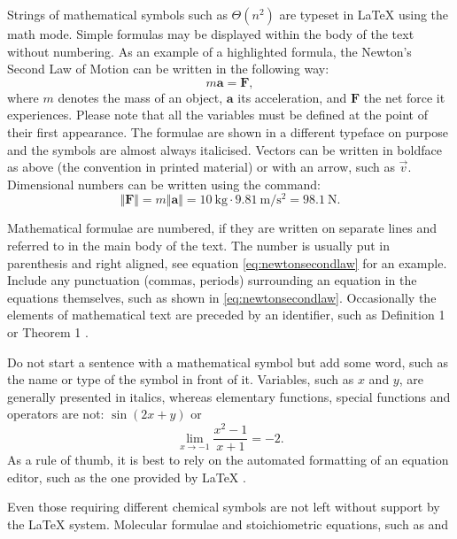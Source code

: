 Strings of mathematical symbols such as $\Theta(n^2)$ are typeset in \LaTeX{} using the math mode. Simple formulas may be displayed within the body of the text without numbering. As an example of a highlighted formula, the Newton’s Second Law of Motion can be written in the following way:
\begin{equation}\label{eq:newtonsecondlaw}
    m\mathbf{a} = \mathbf{F},
\end{equation}
where $m$ denotes the mass of an object, $\mathbf{a}$ its acceleration, and $\mathbf{F}$ the net force it experiences. Please note that all the variables must be defined at the point of their first appearance. The formulae are shown in a different typeface on purpose and the symbols are almost always italicised. Vectors can be written in boldface as above (the convention in printed material) or with an arrow, such as $\vec{v}$. Dimensional numbers can be written using the  command:
\begin{equation*}
    \Vert\mathbf{F}\Vert = m\Vert\mathbf{a}\Vert = \SI{10}{\kilogram} \cdot \SI{9.81}{\metre\per\second\squared} = \SI{98.1}{\newton}.
\end{equation*}

Mathematical formulae are numbered, if they are written on separate lines and referred to in the main body of the text. The number is usually put in parenthesis and right aligned, see equation \eqref{eq:newtonsecondlaw} for an example. Include any punctuation (commas, periods) surrounding an equation in the equations themselves, such as shown in \eqref{eq:newtonsecondlaw}. Occasionally the elements of mathematical text are preceded by an identifier, such as Definition 1 or Theorem 1 \parencite{matohje2009}.

Do not start a sentence with a mathematical symbol but add some word, such as the name or type of the symbol in front of it. Variables, such as $x$ and $y$, are generally presented in italics, whereas elementary functions, special functions and operators are not: $\sin(2x + y)$ or
\begin{equation*}
    \lim_{x \rightarrow -1}\frac{x^2 - 1}{x + 1} = -2.
\end{equation*}
As a rule of thumb, it is best to rely on the automated formatting of an equation editor, such as the one provided by \LaTeX{} \parencite{notsoshort}.

Even those requiring different chemical symbols are not left without support by the \LaTeX{} system. Molecular formulae and stoichiometric equations, such as  and
\begin{center}
\end{center}


